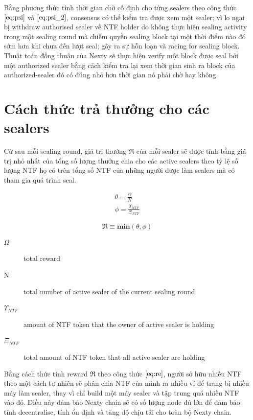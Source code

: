 \documentclass[12pt,oneside]{amsart}
\begin{document}
\begin{multicols}{2}
Bằng phương thức tính thời gian chờ cố định cho từng sealers theo công thức  $\eqref{eq:psi}$ và $\eqref{eq:psi_2}$, consensus có thể kiểm tra được xem một sealer; vì lo ngại bị withdraw authorised sealer về NTF holder do không thực hiện sealing activity trong một sealing round mà chiếm quyền sealing block tại một thời điểm nào đó sớm hơn khi chưa đến lượt seal; gây ra sự hỗn loạn và racing for sealing block. Thuật toán đồng thuận của Nexty sẽ thực hiện verify một block được seal bởi một authorized sealer bằng cách kiểm tra lại xem thời gian sinh ra block của authorized-sealer đó có đúng nhỏ hơn thời gian nó phải chờ hay không.

\section{Cách thức trả thưởng cho các sealers}

Cứ sau mỗi sealing round, giá trị thưởng $\Re$ của mỗi sealer sẽ được tính bằng giá trị nhỏ nhất của tổng số lượng thưởng chia cho các active sealers theo tỷ lệ số lượng NTF họ có trên tổng số NTF của những người được làm sealers mà có tham gia quá trình seal.

\begin{eqnarray}
\theta = \frac{\Omega}{N} \\
\phi = \frac{\Upsilon_{NTF}}{\Xi_{NTF}}
\end{eqnarray}

\begin{equation}\label{eq:re}
\Re \equiv \mathbf{min}(\theta, \phi)
\end{equation}

\begin{description}
\item[$\Omega$] total reward
\item[N] total number of active sealer of the current sealing round
\item[$\Upsilon_{NTF}$] amount of NTF token that the owner of active sealer is holding
\item[$\Xi_{NTF}$] total amount of NTF token that all active sealer are holding
\end{description}

Bằng cách thức tính reward $\Re$ theo công thức $\eqref{eq:re}$, người sở hữu nhiều NTF theo một cách tự nhiên sẽ phân chia NTF của mình ra nhiều ví để trang bị nhiều máy làm sealer, thay vì chỉ build một máy sealer và tập trung quá nhiều NTF vào đó. Điều này đảm bảo Nexty chain sẽ có số lượng node đủ lớn để đảm bảo tính decentralise, tính ổn định và tăng độ chịu tải cho toàn bộ Nexty chain.


\end{multicols}
\end{document}
